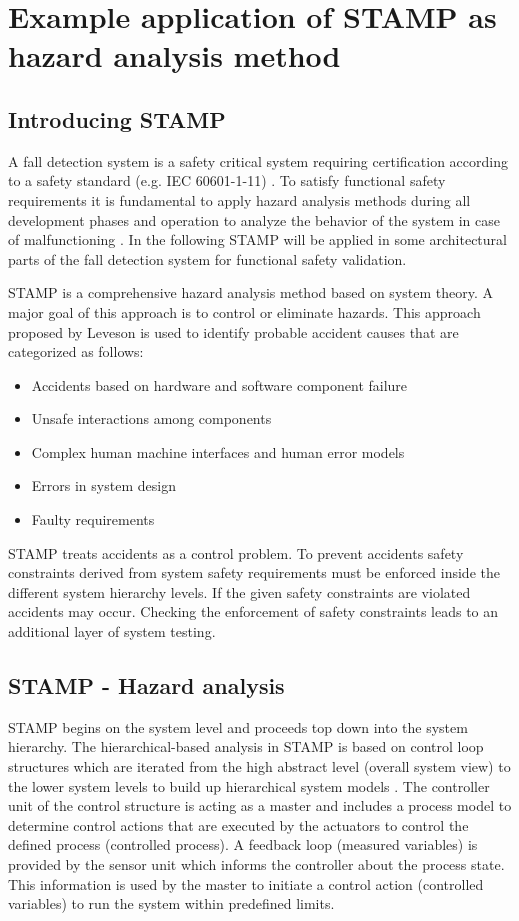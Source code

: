 \documentclass[10pt,journal,compsoc]{IEEEtran}
\begin{document}
\section{Example application of STAMP as hazard analysis method}
\label{sec:STAMP}

\subsection{Introducing STAMP}
A fall detection system is a safety critical system requiring certification according to a safety standard (e.g. IEC 60601-1-11) \cite{international2005medical}. To satisfy functional safety requirements it is fundamental to apply hazard analysis methods during all development phases and operation to analyze the behavior of the system in case of malfunctioning \cite{STAMPThesis}. In the following STAMP will be applied in some architectural parts of the fall detection system for functional safety validation.

STAMP is a comprehensive hazard analysis method based on system theory. A major goal of this approach is to control or eliminate hazards. This approach proposed by Leveson \cite{leveson2011engineering} is used to identify probable accident causes that are categorized as follows:
\begin{itemize}
	\item Accidents based on hardware and software component failure
	\item Unsafe interactions among components
	\item Complex human machine interfaces and human error models
	\item Errors in system design
	\item Faulty requirements
\end{itemize}  
STAMP treats accidents as a control problem. To prevent accidents safety constraints derived from system safety requirements must be enforced inside the different system hierarchy levels. If the given safety constraints are violated accidents may occur. Checking the enforcement of safety constraints leads to an additional layer of system testing. 

\subsection{STAMP - Hazard analysis}
STAMP begins on the system level and proceeds top down into the system hierarchy. The hierarchical-based analysis in STAMP is based on control loop structures which are iterated from the high abstract level (overall system view) to the lower system levels to build up hierarchical system models \cite{leveson2011engineering}. 
The controller unit of the control structure is acting as a master and includes a process model to determine control actions that are executed by the actuators to control the defined process (controlled process). A feedback loop (measured variables) is provided by the sensor unit which informs the controller about the process state. This information is used by the master to initiate a control action (controlled variables) to run the system within predefined limits. 
\end{document}
